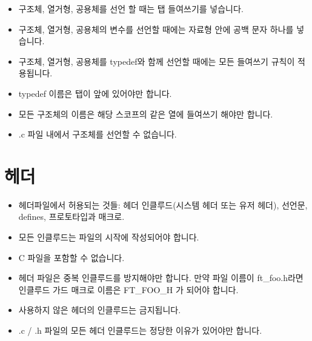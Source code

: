 \documentclass{42-ko}
\begin{document}
        \begin{itemize}

            \item 구조체, 열거형, 공용체를 선언 할 때는 탭 들여쓰기를 넣습니다.

            \item 구조체, 열거형, 공용체의 변수를 선언할 때에는
                자료형 안에 공백 문자 하나를 넣습니다.

            \item 구조체, 열거형, 공용체를 typedef와 함께 선언할 때에는
                모든 들여쓰기 규칙이 적용됩니다.

            \item typedef 이름은 탭이 앞에 있어야만 합니다.

            \item 모든 구조체의 이름은 해당 스코프의 같은 열에 들여쓰기 해야만 합니다.

            \item .c 파일 내에서 구조체를 선언할 수 없습니다.

        \end{itemize}
        \newpage


    \section{헤더}

        \begin{itemize}

            \item 헤더파일에서 허용되는 것들:
                헤더 인클루드(시스템 헤더 또는 유저 헤더),
                선언문, defines, 프로토타입과 매크로.

            \item 모든 인클루드는 파일의 시작에 작성되어야 합니다.

            \item C 파일을 포함할 수 없습니다.

            \item 헤더 파일은 중복 인클루드를 방지해야만 합니다.
                만약 파일 이름이 ft\_foo.h라면 인클루드 가드 매크로 이름은
                FT\_FOO_H 가 되어야 합니다.

            \item 사용하지 않은 헤더의 인클루드는 금지됩니다.

            \item .c / .h 파일의 모든 헤더 인클루드는 정당한 이유가 있어야만 합니다.

        \end{itemize}
\end{document}
